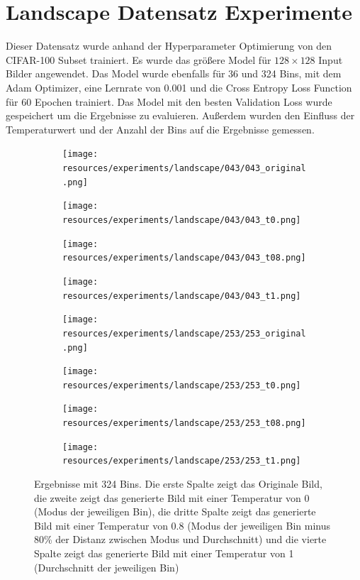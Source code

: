\section{Landscape Datensatz Experimente}
Dieser Datensatz wurde anhand der Hyperparameter Optimierung von den CIFAR-100 Subset trainiert. Es wurde das größere Model für $128 \times 128$
Input Bilder angewendet. Das Model wurde ebenfalls für 36 und 324 Bins, mit dem Adam Optimizer, eine Lernrate von 0.001 und die Cross Entropy 
Loss Function für 60 Epochen trainiert. Das Model mit den besten Validation Loss wurde gespeichert um die Ergebnisse zu evaluieren. Außerdem
wurden den Einfluss der Temperaturwert und der Anzahl der Bins auf die Ergebnisse gemessen.

\begin{figure}[H]
  \centering
  \vspace{1cm}
  \begin{subfigure}
    \centering
    \texttt{[image: resources/experiments/landscape/043/043\_original.png]}
  \end{subfigure}
  \begin{subfigure}
    \centering
    \texttt{[image: resources/experiments/landscape/043/043\_t0.png]}
  \end{subfigure}
  \begin{subfigure}
    \centering
    \texttt{[image: resources/experiments/landscape/043/043\_t08.png]}
  \end{subfigure}
  \begin{subfigure}
    \centering
    \texttt{[image: resources/experiments/landscape/043/043\_t1.png]}
  \end{subfigure}

  \begin{subfigure}
    \centering
    \texttt{[image: resources/experiments/landscape/253/253\_original.png]}
  \end{subfigure}
  \begin{subfigure}
    \centering
    \texttt{[image: resources/experiments/landscape/253/253\_t0.png]}
  \end{subfigure}
  \begin{subfigure}
    \centering
    \texttt{[image: resources/experiments/landscape/253/253\_t08.png]}
  \end{subfigure}
  \begin{subfigure}
    \centering
    \texttt{[image: resources/experiments/landscape/253/253\_t1.png]}
  \end{subfigure}

  \caption{Ergebnisse mit 324 Bins. Die erste Spalte zeigt das Originale Bild, die zweite zeigt das generierte Bild mit einer Temperatur von 0 
  (Modus der jeweiligen Bin), die dritte Spalte zeigt das generierte Bild mit einer Temperatur von 0.8 (Modus der jeweiligen Bin minus 
  80\% der Distanz zwischen Modus und Durchschnitt) und die vierte Spalte zeigt das generierte Bild mit einer Temperatur von 1 
  (Durchschnitt der jeweiligen Bin)}
  \label{image:gute-ergebnisse-cifar}
\end{figure}

